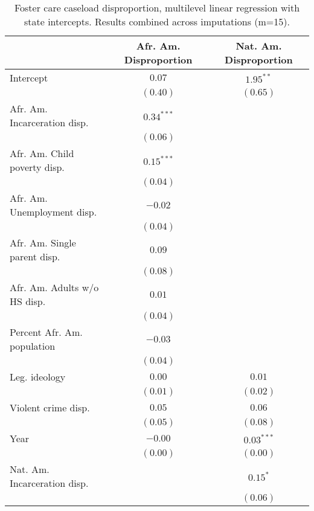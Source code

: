 
\begin{table}
\caption{Foster care caseload disproportion, multilevel linear
regression with state intercepts. Results combined across imputations (m=15).}
\begin{center}
\begin{tabular}{l c c }
\hline
 & Afr. Am. Disproportion & Nat. Am. Disproportion \\
\hline
Intercept                    & $0.07$       & $1.95^{**}$   \\
                             & $(0.40)$     & $(0.65)$      \\
Afr. Am. Incarceration disp. & $0.34^{***}$ &               \\
                             & $(0.06)$     &               \\
Afr. Am. Child poverty disp. & $0.15^{***}$ &               \\
                             & $(0.04)$     &               \\
Afr. Am. Unemployment disp.  & $-0.02$      &               \\
                             & $(0.04)$     &               \\
Afr. Am. Single parent disp. & $0.09$       &               \\
                             & $(0.08)$     &               \\
Afr. Am. Adults w/o HS disp. & $0.01$       &               \\
                             & $(0.04)$     &               \\
Percent Afr. Am. population  & $-0.03$      &               \\
                             & $(0.04)$     &               \\
Leg. ideology                & $0.00$       & $0.01$        \\
                             & $(0.01)$     & $(0.02)$      \\
Violent crime disp.          & $0.05$       & $0.06$        \\
                             & $(0.05)$     & $(0.08)$      \\
Year                         & $-0.00$      & $0.03^{***}$  \\
                             & $(0.00)$     & $(0.00)$      \\
Nat. Am. Incarceration disp. &              & $0.15^{*}$    \\
                             &              & $(0.06)$      \\

\end{tabular}
\end{center}
\end{table}
